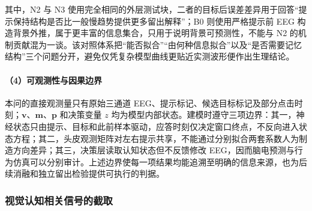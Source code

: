 \documentclass[a4paper]{ctexart}
\numberwithin{figure}{section}       %
\begin{document}
\begin{table}[H]
\centering
\caption{候选认知模型及对照表}
\label{tab:q3_candidates}
\end{table}

其中，N2 与 N3 使用完全相同的外层测试块，二者的目标后误差差异用于回答“提示保持结构是否比一般慢趋势提供更多留出解释”；B0 则使用严格提示前 EEG 构造背景外推，属于更丰富的信息集合，只用于说明背景可预测性，不能与 N2 的机制贡献混为一谈。该对照体系把“能否拟合”“由何种信息拟合”以及“是否需要记忆结构”三个问题分开，避免仅凭复杂模型曲线更贴近实测波形便作出生理结论。

\paragraph{（4）可观测性与因果边界}

本问的直接观测量只有原始三通道 EEG、提示标记、候选目标标记及部分点击时刻；$\boldsymbol v$、$\boldsymbol m$、$\boldsymbol p$ 和决策变量 $z$ 均为模型内部状态。建模时遵守三项边界：其一，神经状态只由提示、目标和此前样本驱动，应答时刻仅决定窗口终点，不反向进入状态方程；其二，头皮观测矩阵对左右提示共享，不能通过分别拟合两套系数人为制造方向差异；其三，决策层读取认知状态但不反馈修改 EEG，因而脑电预测与行为仿真可以分别审计。上述边界使每一项结果均能追溯至明确的信息来源，也为后续消融和独立留出检验提供可执行的判据。

\subsubsection{视觉认知相关信号的截取}
\end{document}
